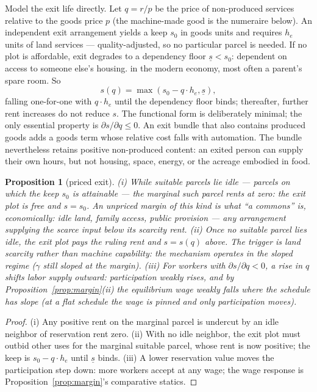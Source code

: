 \documentclass[12pt]{article}
\theoremstyle{plain}
\newtheorem{proposition}{Proposition}
\begin{document}
Model the exit life directly. Let $q = r/p$ be the price of non-produced services relative to the goods price $p$ (the machine-made good is the numeraire below). An independent exit arrangement yields a keep $s_0$ in goods units and requires $h_e$ units of land services --- quality-adjusted, so no particular parcel is needed. If no plot is affordable, exit degrades to a dependency floor $\underline{s} < s_0$: dependent on access to someone else's housing. in the modern economy, most often a parent's spare room. So
\begin{equation}\label{eq:exit}
s(q) = \max( s_0 - q\cdot h_e , \underline{s} ),
\end{equation}
falling one-for-one with $q\cdot h_e$ until the dependency floor binds; thereafter, further rent increases do not reduce $s$. The functional form is deliberately minimal; the only essential property is $\partial s/\partial q \le 0$. An exit bundle that also contains produced goods adds a goods term whose relative cost falls with automation. The bundle nevertheless retains positive non-produced content: an exited person can supply their own hours, but not housing, space, energy, or the acreage embodied in food.

\begin{proposition}[priced exit]\label{prop:exit}
(i) While suitable parcels lie idle --- parcels on which the keep $s_0$ is attainable --- the marginal such parcel rents at zero: the exit plot is free and $s = s_0$. An unpriced margin of this kind is what ``a commons'' is, economically: idle land, family access, public provision --- any arrangement supplying the scarce input below its scarcity rent. (ii) Once no suitable parcel lies idle, the exit plot pays the ruling rent and $s = s(q)$ above. The trigger is land scarcity rather than machine capability: the mechanism operates in the sloped regime ($\gamma$ still sloped at the margin). (iii) For workers with $\partial s/\partial q < 0$, a rise in $q$ shifts labor supply outward: participation weakly rises, and by Proposition~\ref{prop:margin}(ii) the equilibrium wage weakly falls where the schedule has slope (at a flat schedule the wage is pinned and only participation moves).
\end{proposition}

\begin{proof}
(i) Any positive rent on the marginal parcel is undercut by an idle neighbor of reservation rent zero. (ii) With no idle neighbor, the exit plot must outbid other uses for the marginal suitable parcel, whose rent is now positive; the keep is $s_0 - q\cdot h_e$ until $\underline{s}$ binds. (iii) A lower reservation value moves the participation step down: more workers accept at any wage; the wage response is Proposition~\ref{prop:margin}'s comparative statics.
\end{proof}
\end{document}
